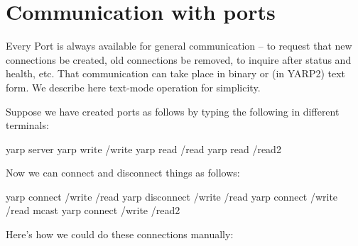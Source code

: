 \documentclass[a4]{article}
\begin{document}



\section{Communication with ports}

Every Port is always available for general communication -- to request
that new connections be created, old connections be removed, to
inquire after status and health, etc.  That communication can take
place in binary or (in YARP2) text form.  We describe here text-mode
operation for simplicity.

Suppose we have created ports as follows by typing the following in
different terminals:
\begin{code}
  yarp server
  yarp write /write
  yarp read /read
  yarp read /read2
\end{code}
%
Now we can connect and disconnect things as follows:
\begin{code}
  yarp connect /write /read
  yarp disconnect /write /read
  yarp connect /write /read mcast
  yarp connect /write /read2
\end{code}

Here's how we could do these connections manually:
\end{document}
